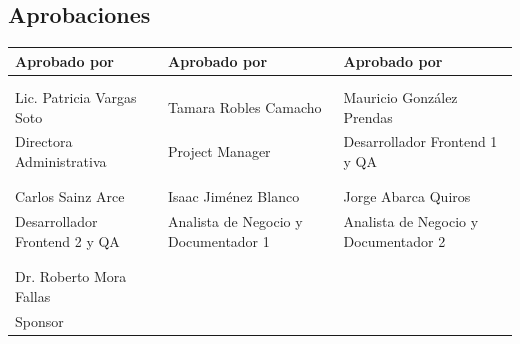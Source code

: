 \documentclass[11pt,spanish]{article}
\begin{document}
\subsection{Aprobaciones}

\begin{table}[H]
\centering
\begin{tabularx}{\textwidth}{Y Y Y}
\toprule
\textbf{Aprobado por} & \textbf{Aprobado por} & \textbf{Aprobado por} \\
\midrule
& & \\
& & \\
Lic. Patricia Vargas Soto & Tamara Robles Camacho & Mauricio González Prendas \\
Directora Administrativa & Project Manager & Desarrollador Frontend 1 y QA \\
\midrule
& & \\
& & \\
Carlos Sainz Arce & Isaac Jiménez Blanco & Jorge Abarca Quiros \\
Desarrollador Frontend 2 y QA & Analista de Negocio y Documentador 1 & Analista de Negocio y Documentador 2 \\
\midrule
& & \\
& & \\
Dr. Roberto Mora Fallas & & \\
Sponsor & & \\
\bottomrule
\end{tabularx}
\end{table}
\end{document}
